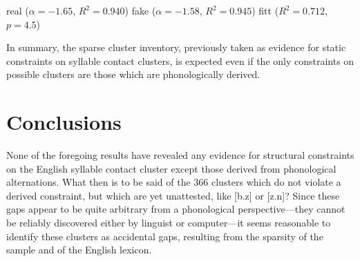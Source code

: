 real ($\alpha = -1.65$, $R^2 = 0.940$)
fake ($\alpha = -1.58$, $R^2 = 0.945$)
fitt ($R^2 = 0.712$, $p = 4.5$)

In summary, the sparse cluster inventory, previously taken as evidence for static constraints on syllable contact clusters, is expected even if the only constraints on possible clusters are those which are phonologically derived.

\section{Conclusions}

None of the foregoing results have revealed any evidence for structural constraints on the English syllable contact cluster except those derived from phonological alternations. What then is to be said of the 366 clusters which do not violate a derived constraint, but which are yet unattested, like [b.z] or [z.n]? Since these gaps appear to be quite arbitrary from a phonological perspective---they cannot be reliably discovered either by linguist or computer---it seems reasonable to identify these clusters as accidental gaps, resulting from the sparsity of the sample and of the English lexicon. 

